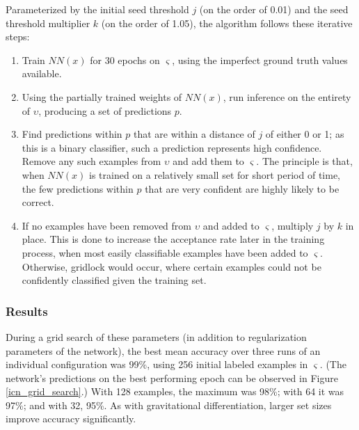 \documentclass[10pt]{article}
\begin{document}
Parameterized by the initial seed threshold $j$ (on the order of 0.01) and the seed threshold multiplier $k$ (on the order of 1.05), the algorithm follows these iterative steps:

\begin{enumerate}
    \item Train $NN(x)$ for 30 epochs on $\varsigma$, using the imperfect ground truth values available.
    \item Using the partially trained weights of $NN(x)$, run inference on the entirety of $\upsilon$, producing a set of predictions $p$.
    \item Find predictions within $p$ that are within a distance of $j$ of either 0 or 1; as this is a binary classifier, such a prediction represents high confidence. Remove any such examples from $\upsilon$ and add them to $\varsigma$. The principle is that, when $NN(x)$ is trained on a relatively small set for short period of time, the few predictions within $p$ that are very confident are highly likely to be correct.
    \item If no examples have been removed from $\upsilon$ and added to $\varsigma$, multiply $j$ by $k$ in place. This is done to increase the acceptance rate later in the training process, when most easily classifiable examples have been added to $\varsigma$. Otherwise, gridlock would occur, where certain examples could not be confidently classified given the training set.
\end{enumerate}

\subsubsection{Results}

During a grid search of these parameters (in addition to regularization parameters of the network), the best mean accuracy over three runs of an individual configuration was 99\%, using 256 initial labeled examples in $\varsigma$. (The network's predictions on the best performing epoch can be observed in Figure \ref{icn_grid_search}.) With 128 examples, the maximum was 98\%; with 64 it was 97\%; and with 32, 95\%. As with gravitational differentiation, larger set sizes improve accuracy significantly.
\end{document}
